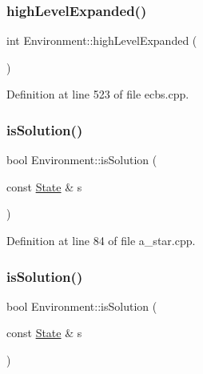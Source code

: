 \subsubsection{\texorpdfstring{high\+Level\+Expanded()}{highLevelExpanded()}\hspace{0.1cm}{\footnotesize\ttfamily [2/2]}}
{\footnotesize\ttfamily int Environment\+::high\+Level\+Expanded (\begin{DoxyParamCaption}{ }\end{DoxyParamCaption})\hspace{0.3cm}{\ttfamily [inline]}}



Definition at line 523 of file ecbs.\+cpp.

\mbox{\label{class_environment_aab14c04c6aaaf6b0d0f26f8b92d44400}} 
\subsubsection{\texorpdfstring{is\+Solution()}{isSolution()}\hspace{0.1cm}{\footnotesize\ttfamily [1/4]}}
{\footnotesize\ttfamily bool Environment\+::is\+Solution (\begin{DoxyParamCaption}\item[{const \hyperlink{struct_state}{State} \&}]{s }\end{DoxyParamCaption})\hspace{0.3cm}{\ttfamily [inline]}}



Definition at line 84 of file a\+\_\+star.\+cpp.

\mbox{\label{class_environment_aab14c04c6aaaf6b0d0f26f8b92d44400}} 
\subsubsection{\texorpdfstring{is\+Solution()}{isSolution()}\hspace{0.1cm}{\footnotesize\ttfamily [2/4]}}
{\footnotesize\ttfamily bool Environment\+::is\+Solution (\begin{DoxyParamCaption}\item[{const \hyperlink{struct_state}{State} \&}]{s }\end{DoxyParamCaption})\hspace{0.3cm}{\ttfamily [inline]}}



